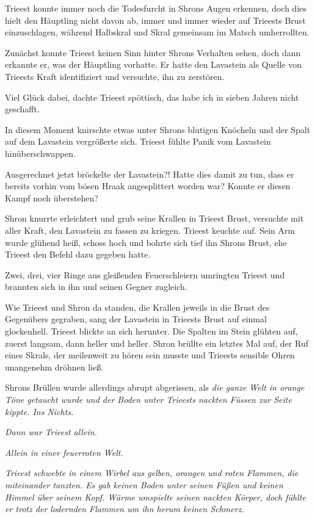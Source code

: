 Trieest konnte immer noch die Todesfurcht in Shrons Augen erkennen, doch dies hielt den Häuptling nicht davon ab, immer und immer wieder auf Trieests Brust einzuschlagen, während Halbskral und Skral gemeinsam im Matsch umherrollten.

Zunächst konnte Trieest keinen Sinn hinter Shrons Verhalten sehen, doch dann erkannte er, was der Häuptling vorhatte. Er hatte den Lavastein als Quelle von Trieests Kraft identifiziert und versuchte, ihn zu zerstören.

Viel Glück dabei, dachte Trieest spöttisch, das habe ich in sieben Jahren nicht geschafft.

In diesem Moment knirschte etwas unter Shrons blutigen Knöcheln und der Spalt auf dem Lavastein vergrößerte sich. Trieest fühlte Panik vom Lavastein hinüberschwappen.

Ausgerechnet jetzt bröckelte der Lavastein?! Hatte dies damit zu tun, dass er bereits vorhin vom bösen Hraak angesplittert worden war? Konnte er diesen Kampf noch überstehen?

Shron knurrte erleichtert und grub seine Krallen in Trieest Brust, versuchte mit aller Kraft, den Lavastein zu fassen zu kriegen. Trieest keuchte auf. Sein Arm wurde glühend heiß, schoss hoch und bohrte sich tief ihn Shrons Brust, ehe Trieest den Befehl dazu gegeben hatte.

Zwei, drei, vier Ringe aus gleißenden Feuerschleiern umringten Trieest und brannten sich in ihn und seinen Gegner zugleich.

Wie Trieest und Shron da standen, die Krallen jeweils in die Brust des Gegenübers gegraben, sang der Lavastein in Trieests Brust auf einmal glockenhell. Trieest blickte an sich herunter. Die Spalten im Stein glühten auf, zuerst langsam, dann heller und heller. Shron brüllte ein letztes Mal auf, der Ruf eines Skrals, der meilenweit zu hören sein musste und Trieests sensible Ohren unangenehm dröhnen ließ.

Shrons Brüllen wurde allerdings abrupt abgerissen, als \textit{die ganze Welt in orange Töne getaucht wurde und der Boden unter Trieests nackten Füssen zur Seite kippte. Ins Nichts.}

\textit{Dann war Trieest allein.}

\textit{Allein in einer feuerroten Welt.}



\trennzeichen



\textit{Trieest schwebte in einem Wirbel aus gelben, orangen und roten Flammen, die miteinander tanzten. Es gab keinen Boden unter seinen Füßen und keinen Himmel über seinem Kopf. Wärme umspielte seinen nackten Körper, doch fühlte er trotz der lodernden Flammen um ihn herum keinen Schmerz.}

